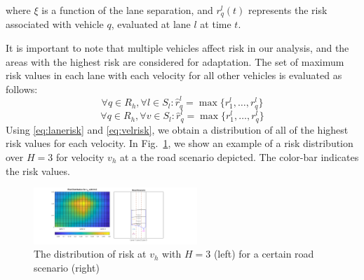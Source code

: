 \documentclass[letterpaper, 10 pt, conference]{ieeeconf}  %
\newcommand\NB[1]{$\spadesuit$\footnote{NB: #1}}
\newcommand\RP[1]{$\clubsuit$\footnote{RP: #1}}
\begin{document}
where $\xi$ is a function of the lane separation, and $r_{q}^{l}(t)$ represents the risk associated with vehicle $q$, evaluated at lane $l$ at time $t$.


It is important to note that multiple vehicles affect risk in our analysis, and the areas with the highest risk are considered for adaptation. The set of maximum risk values in each lane with each velocity for all other vehicles is evaluated as follows: %
\begin{equation} \label{eq:lanerisk} 
    \forall q\in R_h,\forall{l}\in{S_l}: \hat{r}_{q}^l = \max\{r^l_{1},\ldots,r^l_{q}\}
\end{equation}
\begin{equation} \label{eq:velrisk} 
    \forall q\in R_h,\forall{v}\in{S_l}: \hat{r}_{q}^l = \max\{r^l_{1},\ldots,r^l_{q}\}
\end{equation}
Using \eqref{eq:lanerisk} and \eqref{eq:velrisk}, we obtain a distribution of all of the highest risk values for each velocity. In Fig.~\ref{fig:riskd}, we show an example of a risk distribution over $H=3$ for velocity $v_h$ at a the road scenario depicted. The color-bar indicates the risk values.

\begin{figure}[ht]
    \includegraphics[width=0.55\textwidth]{riskdistvsurf.png}
    \caption{The distribution of risk at $v_h$ with $H = 3$ (left) for a certain road scenario (right)}
    \label{fig:riskd}
\end{figure}
\end{document}
